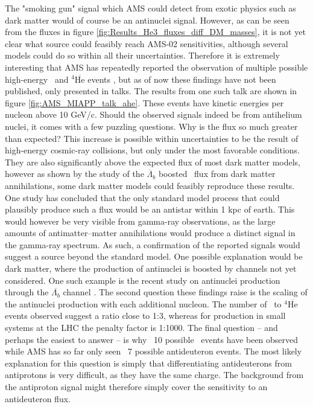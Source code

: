 The "smoking gun" signal which AMS could detect from exotic physics such as dark matter would of course be an antinuclei signal. However, as can be seen from the fluxes in figure \ref{fig:Results_He3_fluxes_diff_DM_masses}, it is not yet clear what source could feasibly reach AMS-02 sensitivities, although several models could do so within all their uncertainties. Therefore it is extremely interesting that AMS has repeatedly reported the observation of multiple possible high-energy \ahe\ and $^4\mathrm{\overline{He}}$ events \cite{}, but as of now these findings have not been published, only presented in talks. The results from one such talk are shown in figure \ref{fig:AMS_MIAPP_talk_ahe}. These events have kinetic energies per nucleon above 10 GeV/c. Should the observed signals indeed be from antihelium nuclei, it comes with a few puzzling questions. Why is the flux so much greater than expected? This increase is possible within uncertainties to be the result of high-energy cosmic-ray collisions, but only under the most favorable conditions. They are also significantly above the expected flux of most dark matter models, however as shown by the study of the $\overline{\Lambda}_b$ boosted \ahe\ flux from dark matter annihilations, some dark matter models could feasibly reproduce these results. One study has concluded that the only standard model process that could plausibly produce such a flux would be an antistar within 1 kpc of earth\cite{}. This would however be very visible from gamma-ray observations, as the large amounts of antimatter--matter annihilations would produce a distinct signal in the gamma-ray spectrum\cite{}. As such, a confirmation of the reported signals would suggest a source beyond the standard model. One possible explanation would be dark matter, where the production of antinuclei is boosted by channels not yet considered. One such example is the recent study on antinuclei production through the $\overline{\Lambda_b}$ channel \cite{}. The second question these findings raise is the scaling of the antinuclei production with each additional nucleon. The number of \ahe\ to $^4\mathrm{\overline{He}}$ events observed suggest a ratio close to 1:3, whereas for production in small systems at the LHC the penalty factor is 1:1000\cite{}. The final question -- and perhaps the easiest to answer -- is why ~10 possible \ahe\ events have been observed while AMS has so far only seen ~7 possible antideuteron events\cite{MIAPP_AMS_talk}. The most likely explanation for this question is simply that differentiating antideuterons from antiprotons is very difficult, as they have the same charge. The background from the antiproton signal might therefore simply cover the sensitivity to an antideuteron flux.\\
